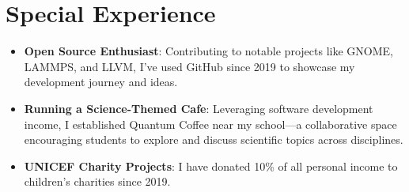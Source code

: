 \documentclass[a4paper,20pt]{article}
\newcommand{\resumeItem}[2]{
  \item\small{
    \textbf{#1}{: #2 \vspace{-2pt}}
  }
}
\newcommand{\resumeSubItem}[2]{\resumeItem{#1}{#2}\vspace{-3pt}}
\newcommand{\resumeSubHeadingListStart}{\begin{itemize}[leftmargin=*]}
\newcommand{\resumeItemListEnd}{\end{itemize}\vspace{-3pt}}
\begin{document}
\section{Special Experience}

\resumeSubHeadingListStart
\resumeSubItem{Open Source Enthusiast}{Contributing to notable projects like GNOME, LAMMPS, and LLVM, I've used GitHub since 2019 to showcase my development journey and ideas.}
\resumeSubItem{Running a Science-Themed Cafe}{Leveraging software development income, I established Quantum Coffee near my school—a collaborative space encouraging students to explore and discuss scientific topics across disciplines.}
\resumeSubItem{UNICEF Charity Projects}{I have donated 10\% of all personal income to children's charities since 2019.}
\resumeItemListEnd
\end{document}
